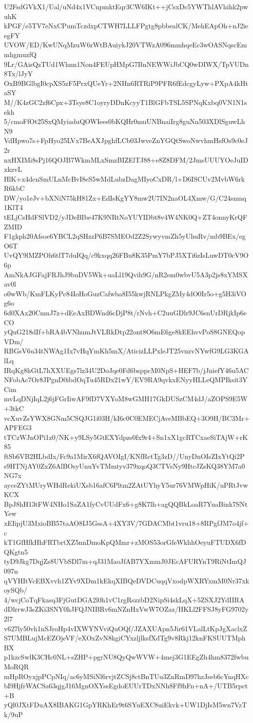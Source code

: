 U2FsdGVkX1/Ual/uNd4x1VCnpmktEqr3CW6IKt++jCsxDc5YWThlAVhihk2pwuhK
kPGF/e5TV7eNxCPumTczdxpCTWH7LLLFPgtg8pbbealCK/MehEApOh+nJ2ieegFY
UVOW/ED/KwUNqMzuW6rWtBAuiykJ20VTWzA096mmhqeEc3wOASNqscEmmhgmuzfQ
9Lr/GAisQzTUd1Whnn1Non4FEUpHMpG7BnNEWWiJbCQ0wDIWX/TpVUDn8Tx/lJyY
OxB9BGlbgI0cpXS5zF5PrxQUeYr+2NHn6RTRiP9PFR6fEdcgyLyw+PXpA4kHtaSY
M//K4zGC2zf6Cpx+3Tsye8C1oyryDDnKcyyT1BlGFbTSL5SPNqKxbq0VN1N1sekh
5/cmoFfOt25SxQMyiaduQOWIees0bKQHr0muUNBnaiIrg8guNn503XDlSguwLhN9
VdHpwo7s+FpHyo25LVx7BeAXJpghfLCb03JwveZnYGQtSwoNwvhmHsfOs9c0eJ2r
nxHXIMi8sPj16QOJB7WkmMLxSmzBIZElTJ88+e8Z8DFM/2JmsUUUYOeJuIDxkzvL
HlK+x4dcnSmULnMcBvI8eS5wMdLubzDagMIyoCxDR/l+D6ISCUv2MvbW6rkR6kbC
DW/yo1eJv+bXNiN75kH81Zx+EdIsKgYY8mw2U7IN2naOL4Xmw/G/C24snmq1KlT4
tELjCsHdFSlVD2/yJDeBIbe47K9NRtNoYUYIDbt8v4W4NK0Q+ZT4onnyKrQFZMID
F1gkph20Afsoe6YBCL2qSHzzP6B7SMEOd2Z2SywyvmZh5yUhuRv/mb9BEx/egO6T
UvQY9lMZPOh6tlT7duIQq/c9kxqq26FBu8K35PmY7bPJ5XTi6zIsLuwDT0cV9O6p
AmNkAJGFajFRJhJ9buDV5Wk+uaLl19Qvih9G/nR2em0wbvU5A3p2js8xYMSXav0l
o0wWb/KmFLKyPc84IoHoGuzCafwba8I55kwjRNLPkgZMy4dO0Ir5o+g5H3iVOg6o
6d0XAx20CnmJ7z+dEeAxBDWnd6cDjP8t/rNvh+C2uuGDlr9JC6snUrDRjkIp6eCO
yQuG218dIf+bRA4bVNhumJtVLRkDtp22ont8O6mE6ge8kEEhvvPoS8GNEQopVDm/
RBGsV6u34tNWAg1Ix7vHqYmKh5mX/AticizLLPxleJT25vnzvNYwfG9LG3KGAlLq
IRqKg8hGtL7hXXUEgs7lz34U2DoJqe0Fd6bsppcM0NpS+HEF7b/jJniefY46u5AC
NFobAc7Or8JPgnD0ibdOqTu45RDx21wY/EV9RA9qvkxENyyHLLeQMPIksit3YCim
mvLqDNjIqL2j6jFGrIiwAF9fD7VXYoM8wGMH17GkDUSzCM4dJ/aZOPS9E5W+3tkC
vcXuvZsYWX8GNm5CSQJG1i03H/kI6c0C0EMECjAveMBbEQ+3O9H/BC3Mr+APFEG3
tTCzWJnOPi1z0/NK+y9LSy5GtEXYdpzs0fx9r4+Sn1xX1gcRTCxaeSiTAjW+rK85
ftSb6VB2HLbdIx/Fc9a1MirX6fQAVOIgI/KNfRctTg3zD//UnyDnOIsZIxYtQi2P
s9HTNjAY0ZxZ6AlBOsyUnuYvTMmtyv379xqoQ3CTVsNy9HtcJZsKQ38YM7a0NG7x
ayceZYtMUryWHdRekiUXsb16afC6Pltm2ZAtUYhyY5ur76VMWpHiK/uPRtJvwKCX
BpJ8hH13tFW4NHo1SaZA1fyCvUUdFx6+g8K7lh+agQQBkLoaR7YuaBink7SNtYew
xEIipjU3MxioBB57taAO8IJ5GssA+4XY3V/7GDACMbt1vru18+8RPgfJM7o4jf+c
kT1GfHfkHhFRTbrtXZ5nnDmoKpQMmr+zMOS53orGfeWkhhOeyuFTUDX6fDQKgtn5
tyD9Jkg7DqjZs8UVbSDl7m+qJ31MaoJfAB7YXmmJ0JEcAFURYnT9RiNtImQJ097n
qVYHItVcEBXvvh1ZYv9XDm1kEkqXIBQeDVDCuqqVxodpWXRYxmM0Nr37xkoySQb/
4/wcjCoTqFkasq3FjGutDGA2l0h1vC1rgRszzbD2NipSi4skLqX+5ZSXJ2YdIIRA
dDlrrwJ3sZKi3SNY0hJFQJNIBRv6mNZnHxVwW7OZaz/HKLl2FFSJ8yFG9702y2l7
v627ly50vh1nSJroHp4vIXWYNVviQuOQf/JZAXUApn5Jir61VLalLtKpJgXaclxZ
S7UMBLujMcEZOjeVF/eXOxZvN8kgiCYxzljlksfXdTg9v8Rkj12knFKSUUTMphBX
p1kzcSwlK3CHc0NL+sZHP+pgrNU8QyQwWVW+4mej3G1EEgZh4hm8372fwbuMoRQR
mHpROyxjpPCpNIq/ac6yMSiNl6rvjtZCSj8ctBnTUu3ZnRmD97hzJseb6cYnqHXc
bI9HjfrWACSa63qjgJ16MgnOXYssEgdoEUUrTDxNNh8Ff9hFn+nA+/UTB5rpct+B
yQl0JXtFDuAX8IBAKG1GpYRKhEr9t6SYuEXC8uiEkvk+UW1DjIsM5wn7VzTk/9uP
